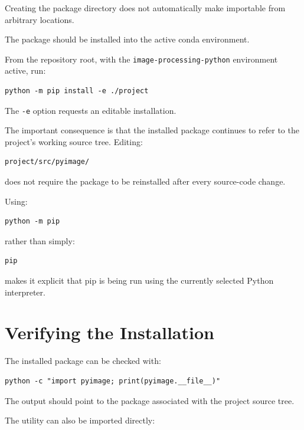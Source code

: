 Creating the package directory does not automatically make
\pyimage{} importable from arbitrary locations.

The package should be installed into the active conda environment.

From the repository root, with the
\texttt{image-processing-python} environment active, run:

\begin{verbatim}
python -m pip install -e ./project
\end{verbatim}

The \texttt{-e} option requests an editable installation.

The important consequence is that the installed package continues to
refer to the project's working source tree. Editing:

\begin{verbatim}
project/src/pyimage/
\end{verbatim}

does not require the package to be reinstalled after every source-code
change.

\begin{implementationnote}
Using:

\begin{verbatim}
python -m pip
\end{verbatim}

rather than simply:

\begin{verbatim}
pip
\end{verbatim}

makes it explicit that pip is being run using the currently selected
Python interpreter.
\end{implementationnote}


\section{Verifying the Installation}
\label{sec:verify-pyimage-install}

The installed package can be checked with:

\begin{verbatim}
python -c "import pyimage; print(pyimage.__file__)"
\end{verbatim}

The output should point to the \pyimage{} package associated with the
project source tree.

The utility can also be imported directly:

